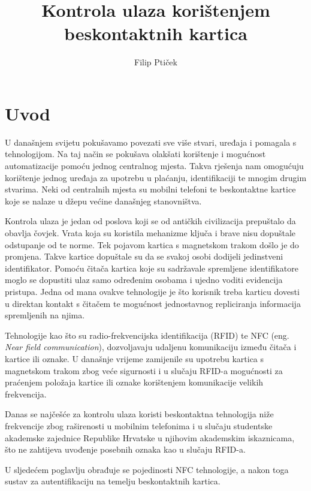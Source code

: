 \documentclass[times, utf8, zavrsni]{fer}
\begin{document}

\title{Kontrola ulaza korištenjem beskontaktnih kartica}

\author{Filip Ptiček}

\maketitle

\izvornik

\zahvala{}

\tableofcontents			

\chapter{Uvod}
U današnjem svijetu pokušavamo povezati sve više stvari, uređaja i pomagala s tehnologijom. Na taj način se pokušava olakšati korištenje i mogućnost automatizacije pomoću jednog centralnog mjesta. Takva rješenja nam omogućuju korištenje jednog uređaja za upotrebu u plaćanju, identifikaciji te mnogim drugim stvarima. Neki od centralnih mjesta su mobilni telefoni te beskontaktne kartice koje se nalaze u džepu većine današnjeg stanovništva.\par
Kontrola ulaza je jedan od poslova koji se od antičkih civilizacija prepuštalo da obavlja čovjek. Vrata koja su koristila mehanizme ključa i brave nisu dopuštale odstupanje od te norme. Tek pojavom kartica s magnetskom trakom došlo je do promjena. Takve kartice dopuštale su da se svakoj osobi dodijeli jedinstveni identifikator. Pomoću čitača kartica koje su sadržavale spremljene identifikatore moglo se dopustiti ulaz samo određenim osobama i ujedno voditi evidencija pristupa. Jedna od mana ovakve tehnologije je što korisnik treba karticu dovesti u direktan kontakt s čitačem te mogućnost jednostavnog repliciranja informacija spremljenih na njima.\par
Tehnologije kao što su radio-frekvencijska identifikacija (RFID) te NFC (eng. \textit{Near field communication}), dozvoljavaju udaljenu komunikaciju između čitača i kartice ili oznake. U današnje vrijeme zamijenile su upotrebu kartica s magnetskom trakom zbog veće sigurnosti i u slučaju RFID-a mogućnosti za praćenjem položaja kartice ili oznake korištenjem komunikacije velikih frekvencija.\par
Danas se najčešće za kontrolu ulaza koristi beskontaktna tehnologija niže frekvencije zbog raširenosti u mobilnim telefonima i u slučaju studentske akademske zajednice Republike Hrvatske u njihovim akademskim iskaznicama, što ne zahtijeva uvođenje posebnih oznaka kao u slučaju RFID-a. \par 
U sljedećem poglavlju obrađuje se pojedinosti NFC tehnologije, a nakon toga sustav za autentifikaciju na temelju beskontaktnih kartica.
\end{document}
